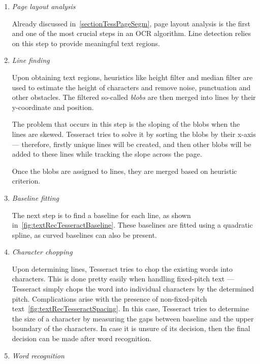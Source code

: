 \begin{enumerate}
    \item \emph{Page layout analysis}
    
    Already discussed in~\cref{sectionTessPageSegm}, page layout analysis is the first and one of the most crucial steps in an OCR algorithm. Line detection relies on this step to provide meaningful text regions.
    
    \item \emph{Line finding}
     
     Upon obtaining text regions, heuristics like height filter and median filter are used to estimate the height of characters and remove noise, punctuation and other obstacles. The filtered so-called \emph{blobs} are then merged into lines by their y-coordinate and position.
     
     The problem that occurs in this step is the sloping of the blobs when the lines are skewed. Tesseract tries to solve it by sorting the blobs by their x-axis --- therefore, firstly unique lines will be created, and then other blobs will be added to these lines while tracking the slope across the page.
     
     Once the blobs are assigned to lines, they are merged based on heuristic criterion.
     
     \item \emph{Baseline fitting}
    
    The next step is to find a baseline for each line, as shown in~\cref{fig:textRecTesseractBaseline}. These baselines are fitted using a quadratic spline, as curved baselines can also be present.
    
    \item \emph{Character chopping}
    
    Upon determining lines, Tesseract tries to chop the existing words into characters. This is done pretty easily when handling fixed-pitch text --- Tesseract simply chops the word into individual characters by the determined pitch. Complications arise with the presence of non-fixed-pitch text~\cref{fig:textRecTesseractSpacing}. In this case, Tesseract tries to determine the size of a character by measuring the gaps between baseline and the upper boundary of the characters. In case it is unsure of its decision, then the final decision can be made after word recognition.
    
    \item \emph{Word recognition}
    

\end{enumerate}

